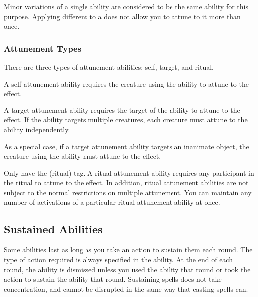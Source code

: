                 Minor variations of a single ability are considered to be the same ability for this purpose.
                Applying different  to a  does not allow you to attune to it more than once.

            \subsubsection{Attunement Types}\label{Attunement Types}
                There are three types of attunement abilities: self, target, and ritual.

                 A self attunement ability requires the creature using the ability to attune to the effect.

                 A target attunement ability requires the target of the ability to attune to the effect.
                If the ability targets multiple creatures, each creature must attune to the ability independently.

                As a special case, if a target attunement ability targets an inanimate object, the creature using the ability must attune to the effect.

                 Only  have the  (ritual) tag.
                A ritual attunement ability requires any participant in the ritual to attune to the effect.
                In addition, ritual attunement abilities are not subject to the normal restrictions on multiple attunement.
                You can maintain any number of activations of a particular ritual attunement ability at once.

        \subsection{Sustained Abilities}\label{Sustained Abilities}
            Some abilities last as long as you take an action to sustain them each round.
            The type of action required is always specified in the ability.
            At the end of each round, the ability is dismissed unless you used the ability that round or took the action to sustain the ability that round.
            Sustaining spells does not take concentration, and cannot be disrupted in the same way that casting spells can.

